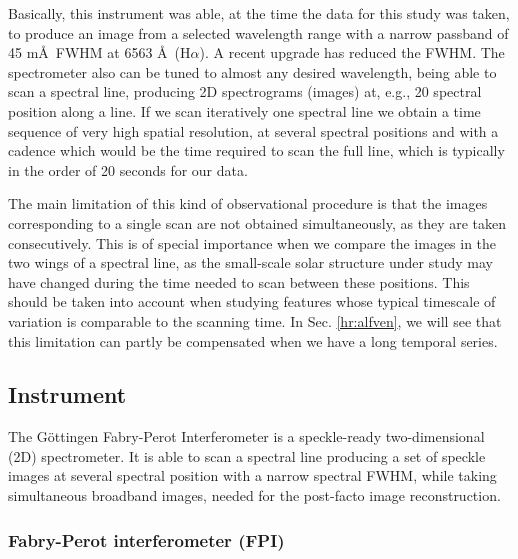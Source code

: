 Basically, this instrument was able, at the time the data for this study was taken, to produce an image from a selected wavelength range with a narrow passband of 45 m\AA\, 
FWHM at 6563 \AA\, (H$\alpha$). A recent upgrade has reduced the FWHM. The spectrometer also can be tuned to almost any desired wavelength, being able to scan a spectral line, producing 2D spectrograms (images) at, e.g., 20 spectral position along a line. If we scan iteratively one spectral line we obtain a time sequence of very high spatial resolution, at several spectral positions and with a cadence which would be the time required to scan the full line, which is typically in the order of 20 seconds for our data.

The main limitation of this kind of observational procedure is that the images corresponding to a single scan are not obtained simultaneously, as they are taken consecutively. This is of special importance when we compare the images in the two wings of a spectral line, as the small-scale solar structure under study may have changed during the time needed to scan between these positions. This should be taken into account when studying features whose typical timescale of variation is comparable to the scanning time. In Sec. \ref{hr:alfven}, we will see that this limitation can partly be  compensated when we have a long temporal series.

\subsection{Instrument\label{obs:fpi}}
The G\"ottingen Fabry-Perot Interferometer is a speckle-ready two-dimensional (2D) spectrometer. It is able to scan a spectral line producing a set of speckle images at several spectral position with a narrow spectral FWHM, while taking simultaneous broadband images, needed for the post-facto image reconstruction.

\subsubsection*{Fabry-Perot interferometer (FPI)}

